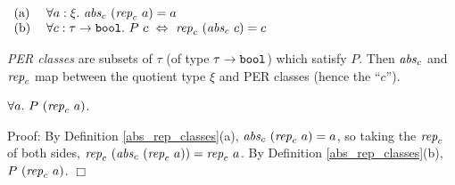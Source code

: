 \documentclass[envcountsame,runningheads]{llncs}
\begin{document}
\begin{definition}
\label{abs_rep_classes}
$
\begin{array}[t]{ll}
(\mbox{\rm a})\ & \forall a:\xi.\ {\it abs}_c \ ({\it rep}_c \ a) = a
\\
(\mbox{\rm b}) & \forall c:\tau \rightarrow \mbox{\tt bool}.\
P\ c
\ \Leftrightarrow \ {\it rep}_c \ ({\it abs}_c \ c) = c
\end{array}
$
\end{definition}

\noindent
{\it PER classes\/}
are subsets of $\tau$ (of type $\tau \rightarrow \mbox{\tt bool}$)
which satisfy $P$.
Then ${\it abs}_c$ and ${\it rep}_c$
map between
the quotient type $\xi$
and
PER classes (hence the ``$c$'').

%

\begin{lemma}
\label{ty_REP_REL}
$\forall a.\
P\ ({\it rep}_c\ a)$.
\end{lemma}
Proof:
By
Definition \ref{abs_rep_classes}(a),
$ {\it abs}_c\ ({\it rep}_c\ a) = a$, so taking
the ${\it rep}_c$ of both sides,
$ {\it rep}_c\ ({\it abs}_c\ ({\it rep}_c\ a)) = {\it rep}_c\ a$.
By
Definition \ref{abs_rep_classes}(b),
$P\ ({\it rep}_c\ a)$.
$\Box$
\end{document}
